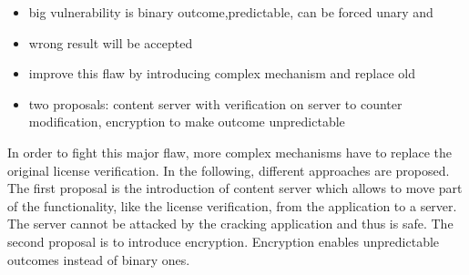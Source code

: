 \begin{itemize}
  \item big vulnerability is binary outcome,predictable, can be forced unary and
  \item wrong result will be accepted
  \item improve this flaw by introducing complex mechanism and replace old
  \item two proposals: content server with verification on server to counter modification, encryption to make outcome unpredictable
\end{itemize}

In order to fight this major flaw, more complex mechanisms have to replace the original license verification.
In the following, different approaches are proposed.
The first proposal is the introduction of content server which allows to move part of the functionality, like the license verification, from the application to a server.
The server cannot be attacked by the cracking application and thus is safe.
\newline
The second proposal is to introduce encryption.
Encryption enables unpredictable outcomes instead of binary ones.
